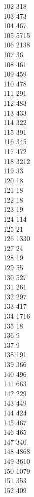 { 102	318 \\
 103	473 \\
 104	467 \\
 105	5715 \\
 106	2138 \\
 107	36 \\
 108	461 \\
 109	459 \\
 110	478 \\
 111	291 \\
 112	483 \\
 113	433 \\
 114	322 \\
 115	391 \\
 116	345 \\
 117	472 \\
 118	3212 \\
 119	33 \\
 120	18 \\
 121	18 \\
 122	18 \\
 123	19 \\
 124	114 \\
 125	21 \\
 126	1330 \\
 127	24 \\
 128	19 \\
 129	55 \\
 130	527 \\
 131	261 \\
 132	297 \\
 133	417 \\
 134	1716 \\
 135	18 \\
 136	9 \\
 137	9 \\
 138	191 \\
 139	366 \\
 140	496 \\
 141	663 \\
 142	229 \\
 143	449 \\
 144	424 \\
 145	467 \\
 146	465 \\
 147	340 \\
 148	4868 \\
 149	3610 \\
 150	1079 \\
 151	353 \\
 152	409 \\
}
